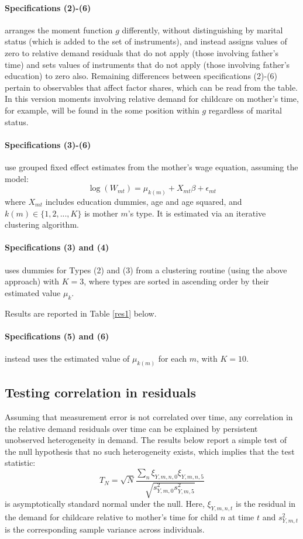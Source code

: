 \documentclass{article}
\begin{document}
\paragraph{Specifications (2)-(6)} arranges the moment function $g$ differently, without distinguishing by marital status (which is added to the set of instruments), and instead assigns values of zero to relative demand residuals that do not apply (those involving father's time) and sets values of instruments that do not apply (those involving father's education) to zero also. Remaining differences between specifications (2)-(6) pertain to observables that affect factor shares, which can be read from the table. In this version moments involving relative demand for childcare on mother's time, for example, will be found in the some position within $g$ regardless of marital status.

\paragraph{Specifications (3)-(6)} use grouped fixed effect estimates from the mother's wage equation, assuming the model:
\[ \log(W_{mt}) = \mu_{k(m)} + X_{mt}\beta + \epsilon_{mt} \]
where $X_{mt}$ includes education dummies, age and age squared, and $k(m)\in\{1,2,...,K\}$ is mother $m$'s type. It is estimated via an iterative clustering algorithm.

\paragraph{Specifications (3) and (4)} uses dummies for Types (2) and (3) from a clustering routine (using the above approach) with $K=3$, where types are sorted in ascending order by their estimated value $\mu_{k}$.

Results are reported in Table \ref{res1} below.

\paragraph{Specifications (5) and (6)} instead uses the estimated value of $\mu_{k(m)}$ for each $m$, with $K=10$.

\subsection*{Testing correlation in residuals}
Assuming that measurement error is not correlated over time, any correlation in the relative demand residuals over time can be explained by persistent unobserved heterogeneity in demand. The results below report a simple test of the null hypothesis that no such heterogeneity exists, which implies that the test statistic:
\[ T_{N} = \sqrt{N}\frac{\sum_{n}\xi_{Y,m,n,0}\xi_{Y,m,n,5}}{\sqrt{s^2_{Y,m,0}s^2_{Y,m,5}}} \]
is asymptotically standard normal under the null. Here, $\xi_{Y,m,n,t}$ is the residual in the demand for childcare relative to mother's time for child $n$ at time $t$ and $s^2_{Y,m,t}$ is the corresponding sample variance across individuals.
\end{document}

